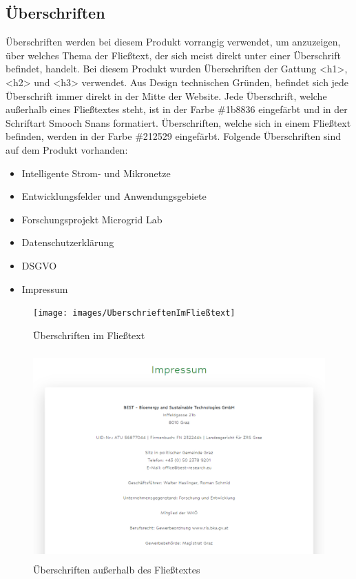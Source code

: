\subsection{Überschriften}
Überschriften werden bei diesem Produkt vorrangig verwendet, um anzuzeigen, über welches Thema der Fließtext, der sich meist direkt unter einer Überschrift befindet, handelt. Bei diesem Produkt wurden Überschriften der Gattung <h1>, <h2> und <h3> verwendet. Aus Design technischen Gründen, befindet sich jede Überschrift immer direkt in der Mitte der Website. Jede Überschrift, welche außerhalb eines Fließtextes steht, ist in der Farbe \#1b8836 eingefärbt und in der Schriftart Smooch Snans formatiert. Überschriften, welche sich in einem Fließtext befinden, werden in der Farbe \#212529 eingefärbt. Folgende Überschriften sind auf dem Produkt vorhanden: 
\begin{itemize}
	\item Intelligente Strom- und Mikronetze
	\item Entwicklungsfelder und Anwendungsgebiete
	\item Forschungsprojekt Microgrid Lab
	\item Datenschutzerklärung
	\item DSGVO
	\item Impressum
\end{itemize}
\newpage
\begin{figure}[h]
	\centering
	\texttt{[image: images/UberschrieftenImFließtext]}
	\caption{Überschriften im Fließtext}
	\label{fig: Überschriften im Fließtext}
\end{figure}
\begin{figure}[h]
	\centering
	\includegraphics[height=8cm,width=14cm]{images/ImpressumUberschrift}
	\caption{Überschriften außerhalb des Fließtextes}
	\label{fig: Überschriften außerhalb des Fließtextes}
\end{figure}
\newpage

